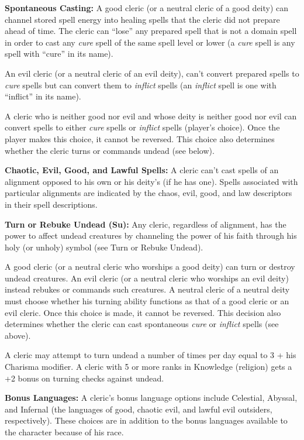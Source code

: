 \documentclass{article}
\begin{document}
\textbf{Spontaneous Casting:} A good cleric (or a neutral cleric of a good deity) 
can channel stored spell energy into healing spells that the cleric did not prepare 
ahead of time. The cleric can ``lose'' any prepared spell that is not a domain 
spell in order to cast any \textit{cure }spell of the same spell level or lower 
(a \textit{cure }spell is any spell with ``cure'' in its name). 

An evil cleric (or a neutral cleric of an evil deity), can't convert prepared spells 
to \textit{cure }spells but can convert them to \textit{inflict }spells (an \textit{inflict 
}spell is one with ``inflict'' in its name).

A cleric who is neither good nor evil and whose deity is neither good nor evil 
can convert spells to either \textit{cure }spells or \textit{inflict }spells (player's 
choice). Once the player makes this choice, it cannot be reversed. This choice 
also determines whether the cleric turns or commands undead (see below).

\textbf{Chaotic, Evil, Good, and Lawful Spells:} A cleric can't cast spells of 
an alignment opposed to his own or his deity's (if he has one). Spells associated 
with particular alignments are indicated by the chaos, evil, good, and law descriptors 
in their spell descriptions.

\textbf{Turn or Rebuke Undead (Su):} Any cleric, regardless of alignment, has the 
power to affect undead creatures by channeling the power of his faith through his 
holy (or unholy) symbol (see Turn or Rebuke Undead).

A good cleric (or a neutral cleric who worships a good deity) can turn or destroy 
undead creatures. An evil cleric (or a neutral cleric who worships an evil deity) 
instead rebukes or commands such creatures. A neutral cleric of a neutral deity 
must choose whether his turning ability functions as that of a good cleric or an 
evil cleric. Once this choice is made, it cannot be reversed. This decision also 
determines whether the cleric can cast spontaneous \textit{cure }or \textit{inflict 
}spells (see above).

A cleric may attempt to turn undead a number of times per day equal to 3 + his 
Charisma modifier. A cleric with 5 or more ranks in Knowledge (religion) gets a 
+2 bonus on turning checks against undead.

\textbf{Bonus Languages:} A cleric's bonus language options include Celestial, 
Abyssal, and Infernal (the languages of good, chaotic evil, and lawful evil outsiders, 
respectively). These choices are in addition to the bonus languages available to 
the character because of his race.
\end{document}

